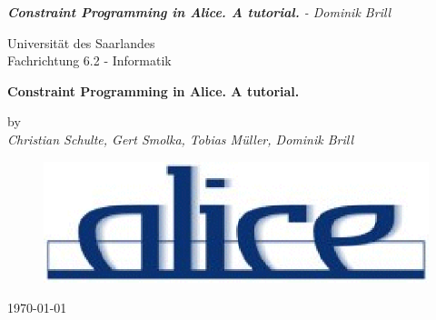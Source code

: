 \documentclass[a4paper]{scrartcl}
\begin{document}
\lstset{language = Alice ML }


\begin{htmlonly}
\newcommand{\lstset}[1]{}
\end{htmlonly}



\newcommand{\db}[1]{\textcolor{black}{#1}}

\renewcommand{\labelitemi}{$\bullet$}
\renewcommand{\labelitemii}{$\bullet$}
\renewcommand{\labelitemiii}{$\bullet$}


         {\it {\bf Constraint Programming in Alice. A tutorial.} - Dominik
  Brill}

\begin{titlepage}
\begin{latexonly}
Universit\"at des Saarlandes\\
Fachrichtung 6.2 - Informatik
\end{latexonly}
\begin{center}
\begin{latexonly}
\vspace{3cm}
\end{latexonly}
\Huge
{\bf Constraint Programming in Alice. A tutorial.}\\
\begin{htmlonly}
\vspace{1cm}
\end{htmlonly}
\begin{latexonly}
\vspace{2cm}
\end{latexonly}
\LARGE
by \\
{\it Christian Schulte, Gert Smolka, Tobias M\"uller, Dominik Brill}
\end{center}
\begin{latexonly}
\vspace{6cm}
\begin{figure}[htpb]
\centerline{
\includegraphics*[scale=0.6]{figs/alice.eps}}
\end{figure}

\vspace{1cm}
\today
\end{latexonly}



\end{titlepage}
\end{document}
